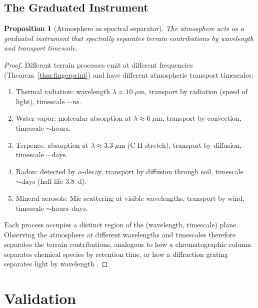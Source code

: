 \documentclass[10pt,twocolumn]{article}
\newtheorem{proposition}[theorem]{Proposition}
\theoremstyle{definition}
\theoremstyle{remark}
\begin{document}
\subsection{The Graduated Instrument}\label{sec:grad_inst}

\begin{proposition}[Atmosphere as spectral separator]
\label{prop:separator}
The atmosphere acts as a graduated instrument that spectrally
separates terrain contributions by wavelength and transport
timescale.
\end{proposition}

\begin{proof}
Different terrain processes emit at different frequencies
(Theorem~\ref{thm:fingerprint}) and have different
atmospheric transport timescales:
\begin{enumerate}[leftmargin=*,itemsep=2pt]
\item Thermal radiation: wavelength $\lambda\approx 10\;\mu\mathrm{m}$,
  transport by radiation (speed of light), timescale
  $\sim\mathrm{ns}$.
\item Water vapor: molecular absorption at $\lambda\approx 6\;\mu\mathrm{m}$,
  transport by convection, timescale $\sim\mathrm{hours}$.
\item Terpenes: absorption at $\lambda\approx 3.3\;\mu\mathrm{m}$
  (C-H stretch), transport by diffusion, timescale $\sim\mathrm{days}$.
\item Radon: detected by $\alpha$-decay, transport by diffusion
  through soil, timescale $\sim\mathrm{days}$ (half-life 3.8~d).
\item Mineral aerosols: Mie scattering at visible wavelengths,
  transport by wind, timescale $\sim\mathrm{hours}$--$\mathrm{days}$.
\end{enumerate}

Each process occupies a distinct region of the
(wavelength, timescale) plane.  Observing the atmosphere at
different wavelengths and timescales therefore separates the
terrain contributions, analogous to how a chromatographic
column separates chemical species by retention time, or how a
diffraction grating separates light by wavelength
\citep{Abbe1873}.
\end{proof}

\section{Validation}\label{sec:validation}
\end{document}
